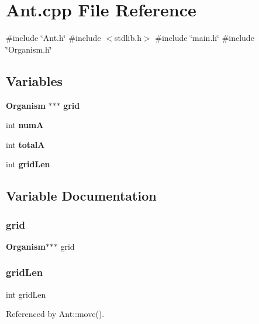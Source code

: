 \section{Ant.\+cpp File Reference}
\label{Ant_8cpp}
{\ttfamily \#include \char`\"{}Ant.\+h\char`\"{}}\newline
{\ttfamily \#include $<$stdlib.\+h$>$}\newline
{\ttfamily \#include \char`\"{}main.\+h\char`\"{}}\newline
{\ttfamily \#include \char`\"{}Organism.\+h\char`\"{}}\newline
\subsection*{Variables}
\begin{DoxyCompactItemize}
\item 
\textbf{ Organism} $\ast$$\ast$$\ast$ \textbf{ grid}
\item 
int \textbf{ numA}
\item 
int \textbf{ totalA}
\item 
int \textbf{ grid\+Len}
\end{DoxyCompactItemize}


\subsection{Variable Documentation}
\mbox{\label{Ant_8cpp_aa32ee8a4e56a98f78518c23b635e5f69}} 
\subsubsection{grid}
{\footnotesize\ttfamily \textbf{ Organism}$\ast$$\ast$$\ast$ grid}

\mbox{\label{Ant_8cpp_a832020065060cfffc4a937e7b009b347}} 
\subsubsection{grid\+Len}
{\footnotesize\ttfamily int grid\+Len}



Referenced by Ant\+::move().

\mbox{\label{Ant_8cpp_ae5ad6ef3971548a3e89364353918967c}} 
